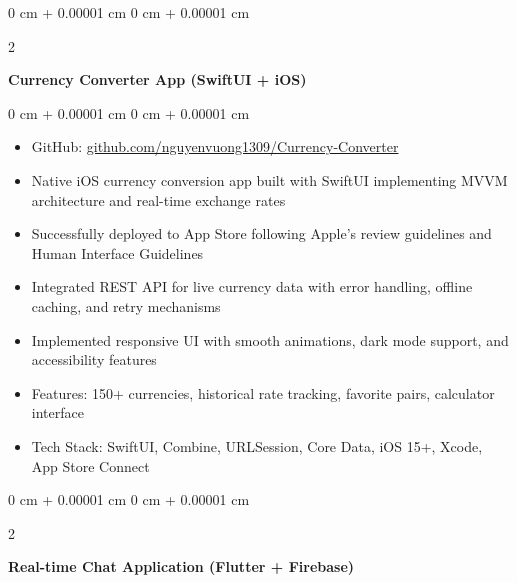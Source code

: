 \documentclass[10pt, letterpaper]{article}
\newenvironment{highlights}{
    \begin{itemize}[
        topsep=0.10 cm,
        parsep=0.10 cm,
        partopsep=0pt,
        itemsep=0pt,
        leftmargin=0 cm + 10pt
    ]
}{
    \end{itemize}
} %
\newenvironment{onecolentry}{
    \begin{adjustwidth}{
        0 cm + 0.00001 cm
    }{
        0 cm + 0.00001 cm
    }
}{
    \end{adjustwidth}
} %
\newenvironment{twocolentry}[2][]{
    \onecolentry
    \def\secondColumn{#2}
    \setcolumnwidth{\fill, 4.5 cm}
    \begin{paracol}{2}
}{
    \switchcolumn \raggedleft \secondColumn
    \end{paracol}
    \endonecolentry
} %
\begin{document}
        \begin{twocolentry}{
            2024
        }
            \textbf{Currency Converter App (SwiftUI + iOS)}
        \end{twocolentry}

        \vspace{0.15 cm}
        \begin{onecolentry}
            \begin{highlights}
                \item GitHub: \href{https://github.com/nguyenvuong1309/Currency-Converter}{github.com/nguyenvuong1309/Currency-Converter}
                \item Native iOS currency conversion app built with SwiftUI implementing MVVM architecture and real-time exchange rates
                \item Successfully deployed to App Store following Apple's review guidelines and Human Interface Guidelines
                \item Integrated REST API for live currency data with error handling, offline caching, and retry mechanisms
                \item Implemented responsive UI with smooth animations, dark mode support, and accessibility features
                \item Features: 150+ currencies, historical rate tracking, favorite pairs, calculator interface
                \item Tech Stack: SwiftUI, Combine, URLSession, Core Data, iOS 15+, Xcode, App Store Connect
            \end{highlights}
        \end{onecolentry}

        \vspace{0.2 cm}

        \begin{twocolentry}{
            2024
        }
            \textbf{Real-time Chat Application (Flutter + Firebase)}
        \end{twocolentry}
\end{document}
